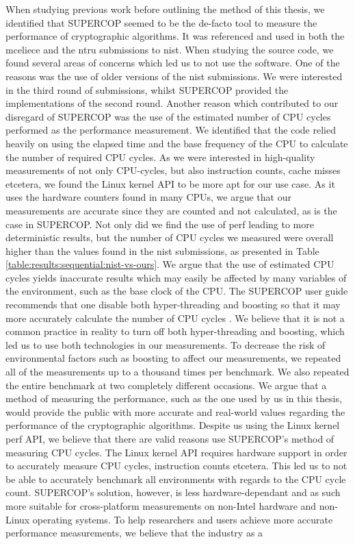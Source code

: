 When studying previous work before outlining the method of this thesis, we identified that SUPERCOP seemed to be the de-facto tool to measure the performance of cryptographic algorithms. It was referenced and used in both the \gls{mceliece} \cite{mceliece2020} and the \gls{ntru} \cite{ntru2020} submissions to \gls{nist}. When studying the source code, we found several areas of concerns which led us to not use the software. One of the reasons was the use of older versions of the \gls{nist} submissions. We were interested in the third round of submissions, whilst SUPERCOP provided the implementations of the second round. Another reason which contributed to our disregard of SUPERCOP was the use of the estimated number of CPU cycles performed as the performance measurement. We identified that the code relied heavily on using the elapsed time and the base frequency of the CPU to calculate the number of required CPU cycles. As we were interested in high-quality measurements of not only CPU-cycles, but also instruction counts, cache misses etcetera, we found the Linux kernel API to be more apt for our use case. As it uses the hardware counters found in many CPUs, we argue that our measurements are accurate since they are counted and not calculated, as is the case in SUPERCOP. Not only did we find the use of perf leading to more deterministic results, but the number of CPU cycles we measured were overall higher than the values found in the \gls{nist} submissions, as presented in Table \ref{table:results:sequential:nist-vs-ours}. We argue that the use of estimated CPU cycles yields inaccurate results which may easily be affected by many variables of the environment, such as the base clock of the CPU. The SUPERCOP user guide recommends that one disable both hyper-threading and boosting so that it may more accurately calculate the number of CPU cycles \cite{supercop}. We believe that it is not a common practice in reality to turn off both hyper-threading and boosting, which led us to use both technologies in our measurements. To decrease the risk of environmental factors such as boosting to affect our measurements, we repeated all of the measurements up to a thousand times per benchmark. We also repeated the entire benchmark at two completely different occasions. We argue that a method of measuring the performance, such as the one used by us in this thesis, would provide the public with more accurate and real-world values regarding the performance of the cryptographic algorithms. Despite us using the Linux kernel perf API, we believe that there are valid reasons use SUPERCOP's method of measuring CPU cycles. The Linux kernel API requires hardware support in order to accurately measure CPU cycles, instruction counts etcetera. This led us to not be able to accurately benchmark all environments with regards to the CPU cycle count. SUPERCOP's solution, however, is less hardware-dependant and as such more suitable for cross-platform measurements on non-Intel hardware and non-Linux operating systems. To help researchers and users achieve more accurate performance measurements, we believe that the industry as a 